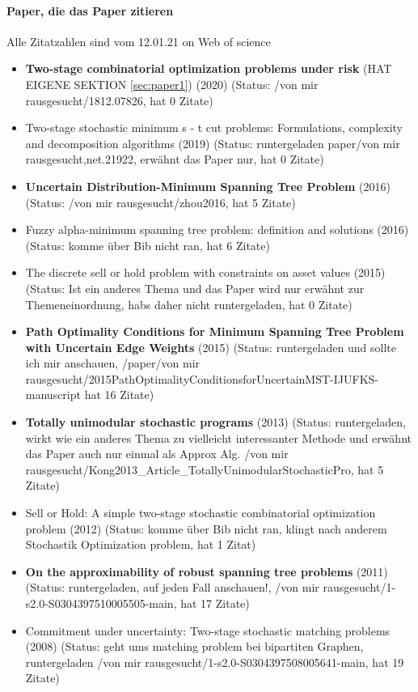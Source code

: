 \documentclass[paper=a4,10pt]{scrartcl}
\begin{document}
\paragraph{Paper, die das Paper zitieren}
Alle Zitatzahlen sind vom 12.01.21 on Web of science
\begin{itemize}
\item \textbf{Two-stage combinatorial optimization problems under risk} (HAT EIGENE SEKTION \ref{sec:paper1}) (2020) (Status: /von mir rausgesucht/1812.07826, hat 0 Zitate)
\item Two-stage stochastic minimum s - t cut problems: Formulations, complexity and decomposition algorithms (2019) (Status: runtergeladen paper/von mir rausgesucht,net.21922, erwähnt das Paper nur, hat 0 Zitate)
\item  \textbf{Uncertain Distribution-Minimum Spanning Tree Problem} (2016) (Status: /von mir rausgesucht/zhou2016, hat 5 Zitate)
\item  Fuzzy alpha-minimum spanning tree problem: definition and solutions (2016) (Status: komme über Bib nicht ran, hat 6 Zitate)
\item  The discrete sell or hold problem with constraints on asset values (2015) (Status: Ist ein anderes Thema und das Paper wird nur erwähnt zur Themeneinordnung, habs daher nicht runtergeladen, hat 0 Zitate)
\item  \textbf{Path Optimality Conditions for Minimum Spanning Tree Problem with Uncertain Edge Weights} (2015) (Status: runtergeladen und sollte ich mir anschauen, /paper/von mir rausgesucht/2015PathOptimalityConditionsforUncertainMST-IJUFKS-manuscript hat 16 Zitate)
\item  \textbf{Totally unimodular stochastic programs} (2013) (Status: runtergeladen, wirkt wie ein anderes Thema zu vielleicht interessanter Methode und erwähnt das Paper auch nur einmal als Approx Alg. /von mir rausgesucht/Kong2013\_Article\_TotallyUnimodularStochasticPro, hat 5 Zitate) 
\item  Sell or Hold: A simple two-stage stochastic combinatorial optimization problem (2012) (Status: komme über Bib nicht ran, klingt nach anderem Stochastik Optimization problem, hat 1 Zitat)
\item  \textbf{On the approximability of robust spanning tree problems} (2011) (Status: runtergeladen, auf jeden Fall anschauen!, /von mir rausgesucht/1-s2.0-S0304397510005505-main, hat 17 Zitate) 
\item  Commitment under uncertainty: Two-stage stochastic matching problems (2008) (Status: geht ums matching problem bei bipartiten Graphen, runtergeladen /von mir rausgesucht/1-s2.0-S0304397508005641-main, hat 19 Zitate)

\end{itemize}
\end{document}
